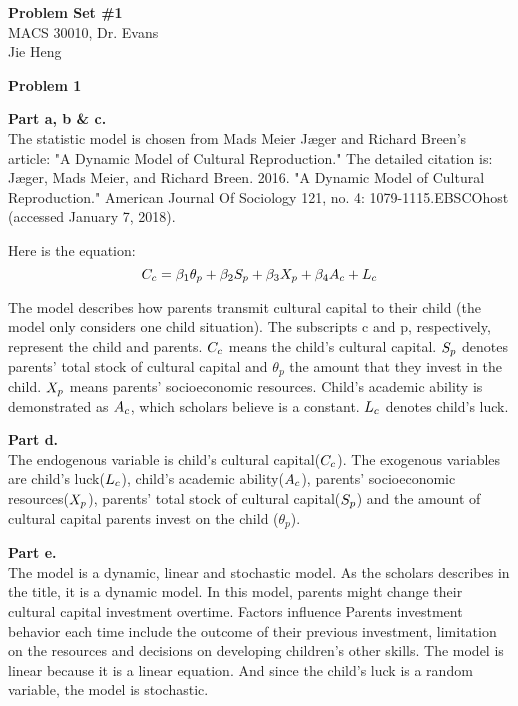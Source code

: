 \documentclass[letterpaper,12pt]{article}
\theoremstyle{definition}
\begin{document}
\begin{flushleft}
  \textbf{\large{Problem Set \#1}} \\
  MACS 30010, Dr. Evans \\
  Jie Heng
\end{flushleft}

\vspace{5mm}

\noindent\textbf{Problem 1}

\vspace{2mm}
\textbf{Part a, b \& c.} \\
The statistic model is chosen from Mads Meier Jæger and Richard Breen's article: "A Dynamic Model of Cultural Reproduction." The detailed citation is: Jæger, Mads Meier, and Richard Breen. 2016. "A Dynamic Model of Cultural Reproduction." American Journal Of Sociology 121, no. 4: 1079-1115.EBSCOhost (accessed January 7, 2018). 

Here is the equation:
\begin{equation*}
  \MakeUppercase{c}_{c} = \beta_{1}\theta_{p}+  \beta_{2}\MakeUppercase{s}_{p} + \beta_{3}\MakeUppercase{x}_{p} + \beta_{4}\MakeUppercase{a}_{c} + \MakeUppercase{l}_{c}
\end{equation*}

The model describes how parents transmit cultural capital to their child (the model only considers one child situation). The subscripts c and p, respectively, represent the child and parents. $\MakeUppercase{c}_{c}$ means the child’s cultural capital. $\MakeUppercase{s}_{p}$ denotes parents’ total stock of cultural capital and $\theta_{p}$ the amount that they invest in the child. $\MakeUppercase{x}_{p}$ means parents' socioeconomic resources. Child's academic ability is demonstrated as $\MakeUppercase{a}_{c}$, which scholars believe is a constant. $\MakeUppercase{l}_{c}$ denotes child's luck. 

\textbf{Part d.} \\
The endogenous variable is child's cultural capital($\MakeUppercase{c}_{c}$). The exogenous variables are child's luck($\MakeUppercase{l}_{c}$), child's academic ability($\MakeUppercase{a}_{c}$), parents' socioeconomic resources($\MakeUppercase{x}_{p}$), parents’ total stock of cultural capital($\MakeUppercase{s}_{p}$) and the amount of cultural capital parents invest on the child ($\theta_{p}$).

\textbf{Part e.} \\
The model is a dynamic, linear and stochastic model. As the scholars describes in the title, it is a dynamic model. In this model, parents might change their cultural capital investment overtime. Factors influence Parents investment behavior each time include the outcome of their previous investment, limitation on the resources and decisions on developing children’s other skills. The model is linear because it is a linear equation. And since the child's luck is a random variable, the model is stochastic.
\end{document}
